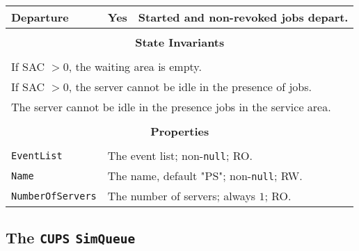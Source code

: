 \documentclass[12pt]{book}
\begin{document}
\begin{tabular}{|l|l|l|}
\hline
Departure & Yes & Started and non-revoked jobs depart. \\
\hline
\multicolumn{3}{|c|}{} \\
\multicolumn{3}{|c|}{\bf State  Invariants} \\
\multicolumn{3}{|c|}{} \\
\hline
\multicolumn{3}{|l|}{If SAC $> 0$, the waiting area is empty.} \\
\multicolumn{3}{|l|}{If SAC $> 0$, the server cannot be idle in the presence of jobs.} \\
\multicolumn{3}{|l|}{The server cannot be idle in the presence jobs in the service area.} \\
\hline
\multicolumn{3}{|c|}{} \\
\multicolumn{3}{|c|}{\bf Properties} \\
\multicolumn{3}{|c|}{} \\
\hline
\lstinline|EventList|       & \multicolumn{2}{|l|}{The event list; non-\lstinline|null|; RO.} \\
\hline
\lstinline|Name|            & \multicolumn{2}{|l|}{The name, default "PS"; non-\lstinline|null|; RW.} \\
\hline
\lstinline|NumberOfServers| & \multicolumn{2}{|l|}{The number of servers; always $1$; RO.} \\
\hline
\end{tabular}

\subsection{The \lstinline{CUPS} \lstinline{SimQueue}}
\end{document}
